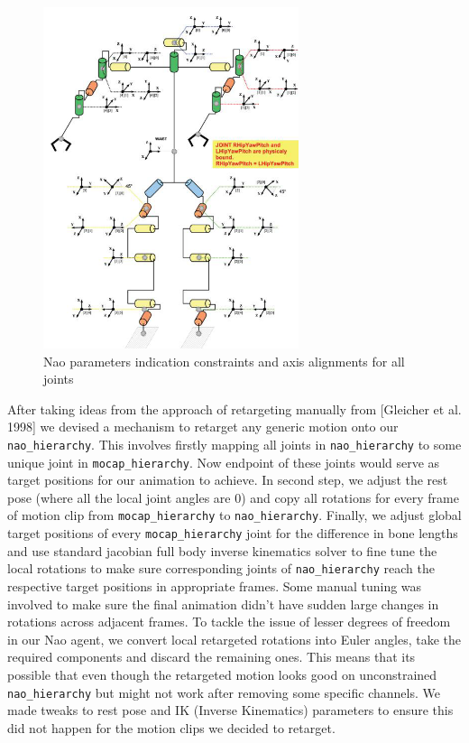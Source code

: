 	\begin{figure}
	\centering
	  \includegraphics[width=0.7\linewidth, height=10cm,keepaspectratio]{images/nao_joints.png}
	  \caption{Nao parameters indication constraints and axis alignments for all joints}
	  \label{fig:nao_joints}
	\end{figure}

	After taking ideas from the approach of retargeting manually from [Gleicher et al. 1998]\cite{Gleicher:1998:RMN:280814.280820} we devised a mechanism to retarget any generic motion onto our \texttt{nao\_hierarchy}. This involves firstly mapping all joints in \texttt{nao\_hierarchy} to some unique joint in \texttt{mocap\_hierarchy}. Now endpoint of these joints would serve as target positions for our animation to achieve. In second step, we adjust the rest pose (where all the local joint angles are 0) and copy all rotations for every frame of motion clip from \texttt{mocap\_hierarchy} to \texttt{nao\_hierarchy}. 
	Finally, we adjust global target positions of every \texttt{mocap\_hierarchy} joint for the difference in bone lengths and use standard jacobian full body inverse kinematics solver to fine tune the local rotations to make sure corresponding joints of \texttt{nao\_hierarchy} reach the respective target positions in appropriate frames. Some manual tuning was involved to make sure the final animation didn't have sudden large changes in rotations across adjacent frames.
	To tackle the issue of lesser degrees of freedom in our Nao agent, we convert local retargeted rotations into Euler angles, take the required components and discard the remaining ones. This means that its possible that even though the retargeted motion looks good on unconstrained \texttt{nao\_hierarchy} but might not work after removing some specific channels. We made tweaks to rest pose and IK (Inverse Kinematics) parameters to ensure this did not happen for the motion clips we decided to retarget. 
  
